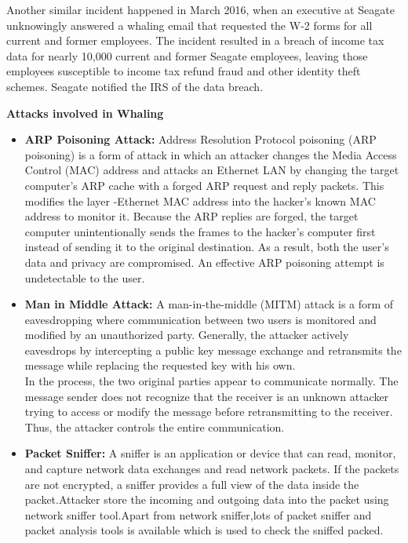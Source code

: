 \documentclass[15pt]{article}
\begin{document}
 Another similar incident happened in March 2016, when an executive at Seagate unknowingly answered a whaling email that requested the W-2 forms for all current and former employees. The incident resulted in a breach of income tax data for nearly 10,000 current and former Seagate employees, leaving those employees susceptible to income tax refund fraud and other identity theft schemes. Seagate notified the IRS of the data breach.
 
 \begin{Large}  \begin{center}
 \textbf{ Attacks involved in Whaling  }
 \end{center} \end{Large}  
 \begin{itemize}
 \item \textbf{ARP Poisoning Attack:} Address Resolution Protocol poisoning (ARP poisoning) is a form of attack in which an attacker changes the Media Access Control (MAC) address and attacks an Ethernet LAN by changing the target computer's ARP cache with a forged ARP request and reply packets. This modifies the layer -Ethernet MAC address into the hacker's known MAC address to monitor it. Because the ARP replies are forged, the target computer unintentionally sends the frames to the hacker's computer first instead of sending it to the original destination. As a result, both the user's data and privacy are compromised. An effective ARP poisoning attempt is undetectable to the user. 
 
\item \textbf{Man in Middle Attack:} A man-in-the-middle (MITM) attack is a form of eavesdropping where communication between two users is monitored and modified by an unauthorized party. Generally, the attacker actively eavesdrops by intercepting a public key message exchange and retransmits the message while replacing the requested key with his own.\\
In the process, the two original parties appear to communicate normally. The message sender does not recognize that the receiver is an unknown attacker trying to access or modify the message before retransmitting to the receiver. Thus, the attacker controls the entire communication. 

\item \textbf{Packet Sniffer:} A sniffer is an application or device that can read, monitor, and capture network data exchanges and read network packets. If the packets are not encrypted, a sniffer provides a full view of the data inside the packet.Attacker store the incoming and outgoing data into the packet using network sniffer tool.Apart from network sniffer,lots of packet sniffer and packet analysis tools is available which is used to check the sniffed packed.
\end{itemize}
 
\end{document}
